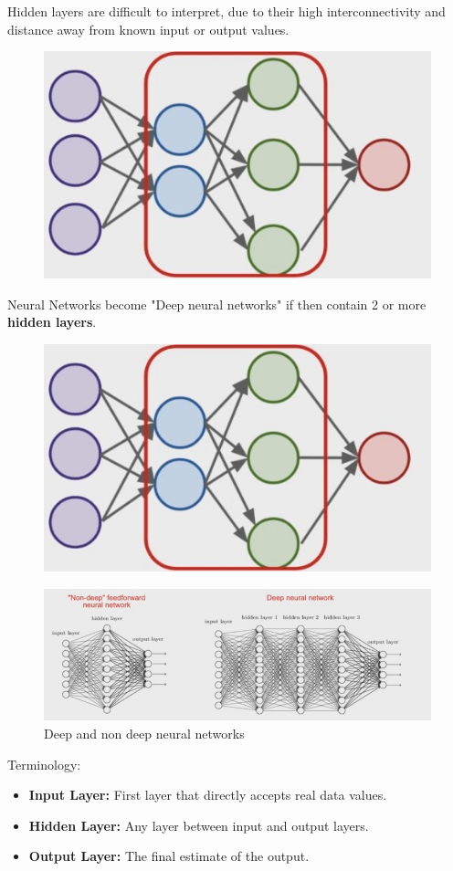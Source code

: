 \documentclass[12pt]{article}
\begin{document}
Hidden layers are difficult to interpret, due to their high interconnectivity and distance away from known input or output values.
\begin{figure}[htbp]	\centerline{\includegraphics[scale=.5]{img/hiddenLayer.jpg}}
\end{figure}

Neural Networks become "Deep neural networks" if then contain 2 or more \textbf{hidden layers}.
\begin{figure}[htbp]	\centerline{\includegraphics[scale=.5]{img/hiddenLayer.jpg}}
\end{figure}


\begin{figure}[htbp]	\centerline{\includegraphics[scale=.52]{img/deep_and_none_deep.jpg}}
\caption{Deep and non deep neural networks}
\end{figure}
\newpage

\Large Terminology:\small
\begin{itemize}
	\item
	\textbf{Input Layer:} First layer that directly accepts real data values.
	\item
	\textbf{Hidden Layer:} Any layer between input and output layers.
	\item
	\textbf{Output Layer:} The final estimate of the output.
\end{itemize}
\end{document}
